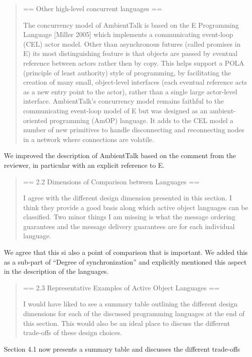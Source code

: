 \documentclass{article}
\begin{document}
\begin{quote}
	== Other high-level concurrent languages ==

The concurrency model of AmbientTalk is based on the E Programming Language [Miller 2005] 
which implements a communicating event-loop (CEL) actor model. Other than asynchronous 
futures (called promises in E) its most distinguishing feature is that objects are passed 
by eventual reference between actors rather then by copy. This helps support a POLA 
(principle of least authority) style of programming, by facilitating the creation of many 
small, object-level interfaces (each eventual reference acts as a new entry point to the 
actor), rather than a single large actor-level interface. AmbientTalk's concurrency model 
remains faithful to the communicating event-loop model of E but was designed as an 
ambient-oriented programming (AmOP) language. It adds to the CEL model a number of new 
primitives to handle disconnecting and reconnecting nodes in a network where connections 
are volatile.
\end{quote}
We improved the description of AmbientTalk based on the comment from the reviewer, in 
particular with an explicit reference to E.

\begin{quote}
	== 2.2 Dimensions of Comparison between Languages ==

I agree with the different design dimension presented in this section. I think they 
provide a good basis along which active object languages can be classified. Two minor 
things I am missing is what the message ordering guarantees and the message delivery 
guarantees are for each individual language.
\end{quote}
We agree that this si also a point of comparison that is important.
We added this as a sub-part of ``Degree of synchronization'' and explicitly mentioned 
this aspect in the description of the languages.

\begin{quote}
	== 2.3 Representative Examples of Active Object Languages ==

I would have liked to see a summary table outlining the different design dimensions for 
each of the discussed programming languages at the end of this section. This would also 
be an ideal place to discuss the different trade-offs of these design choices.
\end{quote}
Section 4.1 now presents a summary table and discusses the different trade-offs
\end{document}
